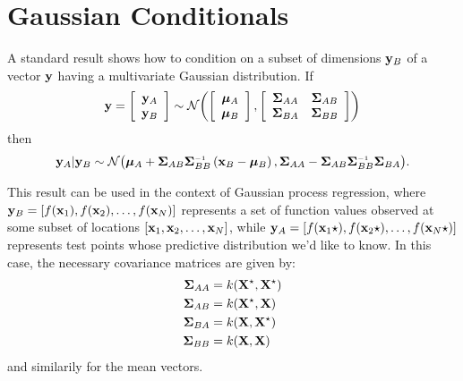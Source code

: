 
\inbpdocument

\chapter{Gaussian Conditionals}
\label{ch:appendix-gaussians}


A standard result shows how to condition on a subset of dimensions ${\bf{y}}_B$ of a vector ${\bf{y}}$ having a multivariate Gaussian distribution.
If
%
\begin{align}
{\bf{y}} = \left[ \begin{array}{c} {{\bf{y}}_A} \\ {{\bf{y}}_B} \end{array} \right] \sim \mathcal{N}\!\left(\left[ \begin{array}{c} {{\boldsymbol{\mu}}_A} \\ {{\boldsymbol{\mu}}_B} \end{array} \right],\left[ \begin{array}{cc}\mathbf{\Sigma}_{AA} & \mathbf{\Sigma}_{AB} \\ \mathbf{\Sigma}_{BA} & \mathbf{\Sigma}_{BB} \end{array} \right]\right)
\end{align}
%
then
%
\begin{align}
\vy_A | \vy_B \sim \mathcal{N} \big(\vmu_A + \vSigma_{AB} \vSigma_{BB}\inv \left( \vx_B - \vmu_B \right),
\vSigma_{AA} - \vSigma_{AB} \vSigma_{BB}\inv \vSigma_{BA} \big).
\label{eq:gauss_conditional}
\end{align}

This result can be used in the context of Gaussian process regression, where ${\bf{y}}_B = [f({\bf{x}}_1), f({\bf{x}}_2), \dots, f({\bf{x}}_N)]$ represents a set of function values observed at some subset of locations $[{\bf{x}}_1, {\bf{x}}_2, \dots, {\bf{x}}_N]$, while ${\bf{y}}_A = [f({\bf{x}}_1\star), f({\bf{x}}_2\star), \ldots, f({\bf{x}}_N\star)]$ represents test points whose predictive distribution we'd like to know.
In this case, the necessary covariance matrices are given by:
%
\begin{align}
\mathbf{\Sigma}_{AA} & = k(\mathbf{X}^\star, \mathbf{X}^\star) \\
\mathbf{\Sigma}_{AB} & = k(\mathbf{X}^\star, \mathbf{X}) \\
\mathbf{\Sigma}_{BA} & = k(\mathbf{X}, \mathbf{X}^\star) \\
\mathbf{\Sigma}_{BB} & = k(\mathbf{X}, \mathbf{X})
\end{align}
and similarily for the mean vectors.






